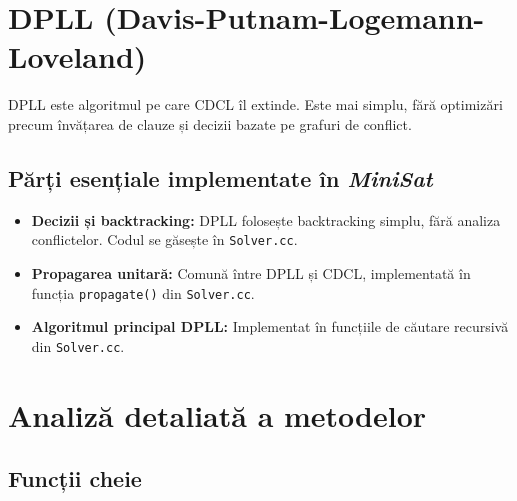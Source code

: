 \documentclass[12pt,a4paper]{report}
\begin{document}
\section*{DPLL (Davis-Putnam-Logemann-Loveland)}
DPLL este algoritmul pe care CDCL îl extinde. Este mai simplu, fără optimizări precum învățarea de clauze și decizii bazate pe grafuri de conflict.

\subsection*{Părți esențiale implementate în \textit{MiniSat}}
\begin{itemize}
    \item \textbf{Decizii și backtracking:} DPLL folosește backtracking simplu, fără analiza conflictelor. Codul se găsește în \texttt{Solver.cc}.
    \item \textbf{Propagarea unitară:} Comună între DPLL și CDCL, implementată în funcția \texttt{propagate()} din \texttt{Solver.cc}.
    \item \textbf{Algoritmul principal DPLL:} Implementat în funcțiile de căutare recursivă din \texttt{Solver.cc}.
\end{itemize}

\section*{Analiză detaliată a metodelor}
\subsection*{Funcții cheie}
\end{document}
